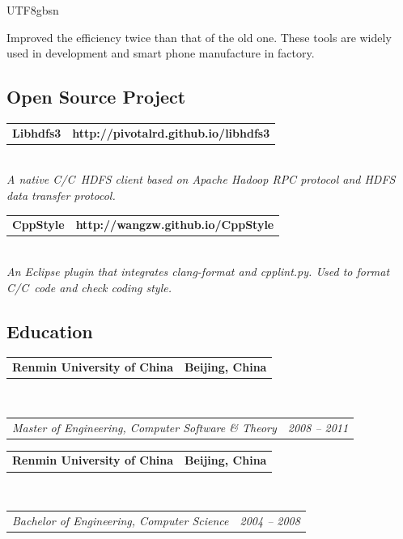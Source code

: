 \documentclass[10pt,letterpaper]{article}
\makeatletter
\newcommand{\headerrow}[2]
{\begin{tabular*}{\linewidth}{l@{\extracolsep{\fill}}r}
	#1 &
	#2 \\
\end{tabular*}}
\newcommand{\CPP}
{C\nolinebreak[4]\hspace{-.05em}\raisebox{.22ex}{\footnotesize\bf ++}}
\makeatother
\begin{document}
\begin{CJK}{UTF8}{gbsn}
\begin{itemize}
\begin{itemize*}
		\item Improved the efficiency twice than that of the old one. These tools are widely used in development and smart phone manufacture in factory. 
	\end{itemize*}
\end{itemize}

\vspace{-8mm}
\subsection*{Open Source Project}
\vspace{-2mm}

\begin{itemize*}
	\parskip=0.2mm

	\item 
	\headerrow
		{\textbf{Libhdfs3}}
		{\textbf{http://pivotalrd.github.io/libhdfs3}}
	\\
	{\emph{A native C/\CPP\  HDFS client based on Apache Hadoop RPC protocol and HDFS data transfer protocol.}}
	
	\item 
	\headerrow
		{\textbf{CppStyle}}
		{\textbf{http://wangzw.github.io/CppStyle}}
	\\
	{\emph{An Eclipse plugin that integrates clang-format and cpplint.py. Used to format C/\CPP\ code and check coding style.}}

\end{itemize*}

\vspace{-8mm}
\subsection*{Education}
\vspace{-2mm}

\begin{itemize*}
	\parskip=0.2mm

	\item 
	\headerrow
		{\textbf{Renmin University of China}}
		{\textbf{Beijing, China}}
	\\
	\headerrow
		{\emph{Master of Engineering, Computer Software \& Theory}}
		{\emph{2008 -- 2011}}

	\item 
	\headerrow
		{\textbf{Renmin University of China}}
		{\textbf{Beijing, China}}
	\\
	\headerrow
		{\emph{Bachelor of Engineering, Computer Science}}
		{\emph{2004 -- 2008}}


\end{itemize*}
\end{CJK}
\end{document}
